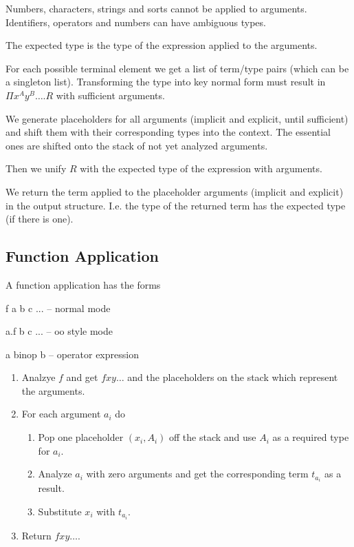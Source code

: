 Numbers, characters, strings and sorts cannot be applied to
arguments. Identifiers, operators and numbers can have ambiguous types.

The expected type is the type of the expression applied to the arguments.

For each possible terminal element we get a list of term/type pairs (which can
be a singleton list). Transforming the type into key normal form must result
in $\Pi x^A y^B \ldots . R$ with sufficient arguments.

We generate placeholders for all arguments (implicit and explicit, until
sufficient) and shift them with their corresponding types into the
context. The essential ones are shifted onto the stack of not yet analyzed
arguments.

Then we unify $R$ with the expected type of the expression with arguments.

We return the term applied to the placeholder arguments (implicit and
explicit) in the output structure. I.e. the type of the returned term has the
expected type (if there is one).




\subsection{Function Application}

A function application has the forms

\begin{alba}
  f a b c ...        -- normal mode

  a.f b c ...        -- oo style mode

  a binop b          -- operator expression
\end{alba}


\begin{enumerate}

\item Analzye $f$ and get $f x y \ldots$ and the placeholders on the stack
  which represent the arguments.


\item For each argument $a_i$ do
  \begin{enumerate}

  \item Pop one placeholder $(x_i,A_i)$ off the stack and use $A_i$ as a
    required type for $a_i$.

  \item Analyze $a_i$ with zero arguments and get the corresponding term
    $t_{a_i}$ as a result.

  \item Substitute $x_i$ with $t_{a_i}$.

  \end{enumerate}

\item Return $f x y \ldots$.

\end{enumerate}




